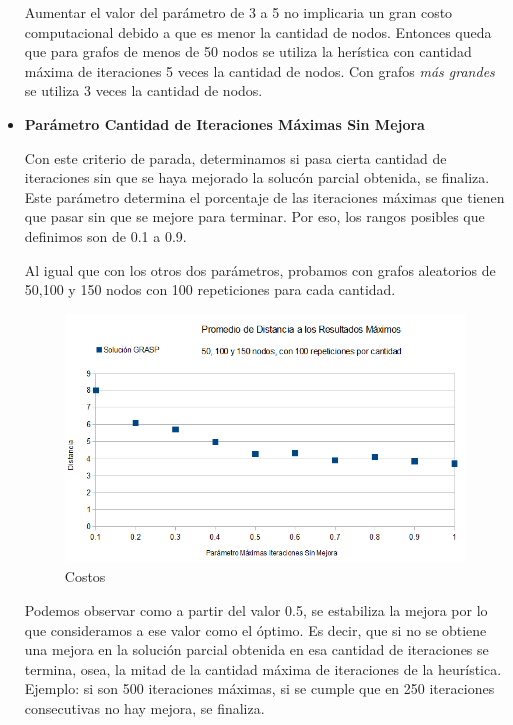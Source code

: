 \begin{itemize}
\quad Aumentar el valor del parámetro de 3 a 5 no implicaria un gran costo computacional debido a que es menor la cantidad de nodos. Entonces queda que para grafos de menos de 50 nodos se utiliza la herística con cantidad máxima de iteraciones 5 veces la cantidad de nodos. Con grafos \textit{más grandes} se utiliza 3 veces la cantidad de nodos.

\item \textbf{Parámetro Cantidad de Iteraciones Máximas Sin Mejora}

\quad

\quad Con este criterio de parada, determinamos si pasa cierta cantidad de iteraciones sin que se haya mejorado la solucón parcial obtenida, se finaliza. Este parámetro determina el porcentaje de las iteraciones máximas que tienen que pasar sin que se mejore para terminar. Por eso, los rangos posibles que definimos son de 0.1 a 0.9.

\quad Al igual que con los otros dos parámetros, probamos con grafos aleatorios de 50,100 y 150 nodos con 100 repeticiones para cada cantidad.

\begin{figure}[H]
	\centering
	\includegraphics[scale=0.6]{optimizacionGRASPParIterMaxSinMejora.png}
\caption{Costos}
\end{figure}

\quad Podemos observar como a partir del valor 0.5, se estabiliza la mejora por lo que consideramos a ese valor como el óptimo. Es decir, que si no se obtiene una mejora en la solución parcial obtenida en esa cantidad de iteraciones se termina, osea, la mitad de la cantidad máxima de iteraciones de la heurística. Ejemplo: si son 500 iteraciones máximas, si se cumple que en 250 iteraciones consecutivas no hay mejora, se finaliza.

\end{itemize}
